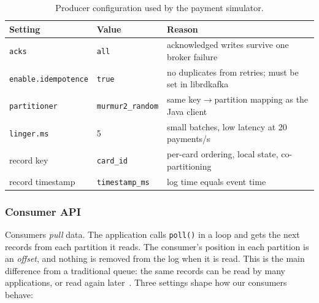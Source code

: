 \begin{table}[h]
\centering
\small
\begin{tabular}{@{}lll@{}}
\toprule
Setting & Value & Reason \\
\midrule
\texttt{acks} & \texttt{all} & acknowledged writes survive one broker failure \\
\texttt{enable.idempotence} & \texttt{true} & no duplicates from retries; must be set in librdkafka \\
\texttt{partitioner} & \texttt{murmur2\_random} & same key$\rightarrow$partition mapping as the Java client \\
\texttt{linger.ms} & 5 & small batches, low latency at 20 payments/s \\
record key & \texttt{card\_id} & per-card ordering, local state, co-partitioning \\
record timestamp & \texttt{timestamp\_ms} & log time equals event time \\
\bottomrule
\end{tabular}
\caption{Producer configuration used by the payment simulator.}
\label{tab:producer-config}
\end{table}

\subsubsection{Consumer API}

Consumers \emph{pull} data. The application calls \texttt{poll()} in a loop and gets the next records from each partition it reads. The consumer's position in each partition is an \emph{offset}, and nothing is removed from the log when it is read. This is the main difference from a traditional queue: the same records can be read by many applications, or read again later~\cite{shapira2021}. Three settings shape how our consumers behave:

